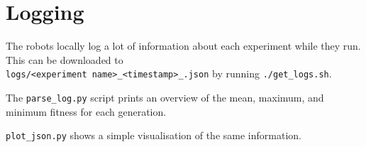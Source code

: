 \documentclass{article}
\begin{document}
	\section{Logging} %
	\label{apx:sec:logging}
	The robots locally log a lot of information about each experiment while
	they run. This can be downloaded to\\\texttt{logs/<experiment
	name>\_<timestamp>\_<git hash>.json} by running \texttt{./get\_logs.sh}.

	The \texttt{parse\_log.py} script prints an overview of the mean, maximum,
	and minimum fitness for each generation.

	\texttt{plot\_json.py} shows a simple visualisation of the same
	information.




\end{document}
